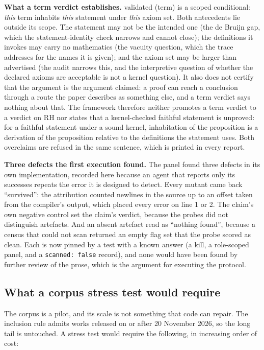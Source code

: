\documentclass[11pt,a4paper]{article}
\newcommand{\RH}{\mathrm{RH}}
\newcommand{\verdict}[1]{\textsf{#1}}
\begin{document}
\textbf{What a term verdict establishes.} \verdict{validated (term)} is a scoped
conditional: \emph{this} term inhabits \emph{this} statement under \emph{this} axiom set. Both
antecedents lie outside its scope. The statement may not be the intended one (the de Bruijn gap,
which the statement-identity check narrows and cannot close); the definitions it invokes may carry
no mathematics (the vacuity question, which the trace addresses for the names it is given); and the
axiom set may be larger than advertised (the audit narrows this, and the interpretive question of
whether the declared axioms are acceptable is not a kernel question). It also does not certify that
the argument is the argument claimed: a proof can reach a conclusion through a route the paper
describes as something else, and a term verdict says nothing about that. The framework therefore
neither promotes a term verdict to a verdict on $\RH$ nor states that a kernel-checked faithful
statement is unproved: for a faithful statement under a sound kernel, inhabitation of the proposition
is a derivation of the proposition relative to the definitions the statement uses. Both overclaims
are refused in the same sentence, which is printed in every report.

\textbf{Three defects the first execution found.} The panel found three defects in its own
implementation, recorded here because an agent that reports only its successes repeats the error it
is designed to detect. Every mutant came back ``survived'': the attribution counted newlines in the
source up to an offset taken from the compiler's output, which placed every error on line 1 or 2.
The claim's own negative control set the claim's verdict, because the probes did not distinguish
artefacts. And an absent artefact read as ``nothing found'', because a census that could not scan
returned an empty flag set that the probe scored as clean. Each is now pinned by a test with a known
answer (a kill, a role-scoped panel, and a \texttt{scanned: false} record), and none would have been
found by further review of the prose, which is the argument for executing the protocol.

\subsection{What a corpus stress test would require}

The corpus is a pilot, and its scale is not something that code can repair. The inclusion rule admits works released on or after 20 November 2026,
so the long tail is untouched. A stress test would require the following, in increasing order of
cost:
\end{document}
